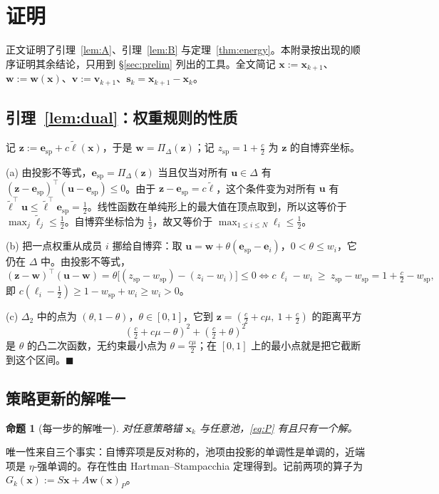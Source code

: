 \documentclass{article}
\theoremstyle{plain}
\newtheorem{proposition}[theorem]{命题}
\theoremstyle{remark}
\newcommand{\Proj}{\Pi}
\newcommand{\simplex}{\Delta}
\newcommand{\bx}{{\bm{x}}}
\newcommand{\bv}{{\bm{v}}}
\newcommand{\bw}{{\bm{w}}}
\newcommand{\bz}{{\bm{z}}}
\newcommand{\bu}{{\bm{u}}}
\newcommand{\be}{{\bm{e}}}
\newcommand{\bell}{{\bm{\ell}}}
\newcommand{\aug}{\tilde{\bell}}
\newcommand{\dx}{{\bm{s}}}
\newcommand{\esp}{\be_{\mathrm{sp}}}
\newcommand{\wsp}{w_{\mathrm{sp}}}
\begin{document}



\appendix
\section{证明}
\label{app:proofs}

正文证明了引理~\ref{lem:A}、引理~\ref{lem:B} 与定理~\ref{thm:energy}。本附录按出现的顺序证明其余结论，只用到 \S\ref{sec:prelim} 列出的工具。全文简记 $\bx:=\bx_{k+1}$、$\bw:=\bw(\bx)$、$\bv:=\bv_{k+1}$、$\dx_k=\bx_{k+1}-\bx_k$。

\subsection{引理~\ref{lem:dual}：权重规则的性质}
\label{app:dual}

记 $\bz:=\esp+c\aug(\bx)$，于是 $\bw=\Proj_\simplex(\bz)$；记 $z_{\mathrm{sp}}=1+\tfrac c2$ 为 $\bz$ 的自博弈坐标。

(a) 由投影不等式，$\esp=\Proj_\simplex(\bz)$ 当且仅当对所有 $\bu\in\simplex$ 有 $(\bz-\esp)^\top(\bu-\esp)\le0$。由于 $\bz-\esp=c\aug$，这个条件变为对所有 $\bu$ 有 $\aug^\top \bu\le\aug^\top \esp=\tfrac12$。线性函数在单纯形上的最大值在顶点取到，所以这等价于 $\max_j\tilde\ell_j\le\tfrac12$。自博弈坐标恰为 $\tfrac12$，故又等价于 $\max_{1\le i\le N}\ell_i\le\tfrac12$。

(b) 把一点权重从成员 $i$ 挪给自博弈：取 $\bu=\bw+\theta(\esp-\be_i)$，$0<\theta\le w_i$，它仍在 $\simplex$ 中。由投影不等式，
\[
(\bz-\bw)^\top(\bu-\bw)=\theta\big[(z_{\mathrm{sp}}-\wsp)-(z_i-w_i)\big]\le0
\iff c\,\ell_i-w_i\ \ge\ z_{\mathrm{sp}}-\wsp=1+\tfrac c2-\wsp ,
\]
即 $c(\ell_i-\tfrac12)\ge1-\wsp+w_i\ge w_i>0$。

(c) $\simplex_2$ 中的点为 $(\theta,1-\theta)$，$\theta\in[0,1]$，它到 $\bz=(\tfrac c2+c\mu,\ 1+\tfrac c2)$ 的距离平方
\[
(\tfrac c2+c\mu-\theta)^2+(\tfrac c2+\theta)^2
\]
是 $\theta$ 的凸二次函数，无约束最小点为 $\theta=\tfrac{c\mu}2$；在 $[0,1]$ 上的最小点就是把它截断到这个区间。\hfill$\blacksquare$

\subsection{策略更新的解唯一}
\label{app:unique}

\begin{proposition}[每一步的解唯一]
\label{prop:unique}
对任意策略锚 $\bx_k$ 与任意池，\eqref{eq:P} 有且只有一个解。
\end{proposition}
唯一性来自三个事实：自博弈项是反对称的，池项由投影的单调性是单调的，近端项是 $\eta$-强单调的。存在性由 Hartman--Stampacchia 定理得到。记前两项的算子为 $G_k(\bx):=S\bx+A\bw(\bx)_P$。
\end{document}
